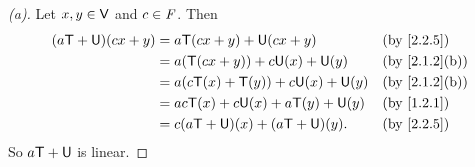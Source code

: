 \begin{proof}[(a)]
  Let \(x, y \in \mathsf{V}\) and \(c \in \mathit{F}\).
  Then
  \begin{align*}
    (a \T + \U)(cx + y) & = a \T(cx + y) + \U(cx + y)            &  & \text{(by \cref{2.2.5})}    \\
                        & = a(\T(cx + y)) + c \U(x) + \U(y)      &  & \text{(by \cref{2.1.2}(b))} \\
                        & = a(c \T(x) + \T(y)) + c \U(x) + \U(y) &  & \text{(by \cref{2.1.2}(b))} \\
                        & = ac \T(x) + c \U(x) + a \T(y) + \U(y) &  & \text{(by \cref{1.2.1})}    \\
                        & = c (a \T + \U)(x) + (a \T + \U)(y).   &  & \text{(by \cref{2.2.5})}
  \end{align*}
  So \(a \mathsf{T} + \mathsf{U}\) is linear.
\end{proof}

